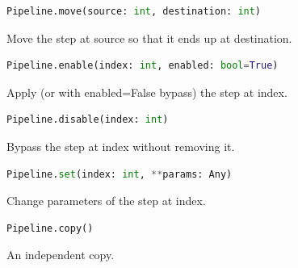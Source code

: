 \begin{samepage}

\begin{lstlisting}[language=Python]
Pipeline.move(source: int, destination: int)
\end{lstlisting}

Move the step at source so that it ends up at destination.

\end{samepage}



\begin{samepage}

\begin{lstlisting}[language=Python]
Pipeline.enable(index: int, enabled: bool=True)
\end{lstlisting}

Apply (or with enabled=False bypass) the step at index.

\end{samepage}



\begin{samepage}

\begin{lstlisting}[language=Python]
Pipeline.disable(index: int)
\end{lstlisting}

Bypass the step at index without removing it.

\end{samepage}



\begin{samepage}

\begin{lstlisting}[language=Python]
Pipeline.set(index: int, **params: Any)
\end{lstlisting}

Change parameters of the step at index.

\end{samepage}



\begin{samepage}

\begin{lstlisting}[language=Python]
Pipeline.copy()
\end{lstlisting}

An independent copy.

\end{samepage}



